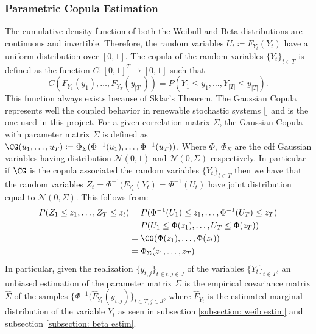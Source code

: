\subsubsection{Parametric Copula Estimation}
The cumulative density function of both the Weibull and Beta distributions are continuous and invertible. Therefore, the random variables \( U_t \coloneqq F_{Y_t}(Y_t) \) have a uniform distribution over \([0,1]\). The copula of the random variables \(\{Y_t\}_{t \in T}\) is defined as the function \(C: [0,1]^T \to [0,1]\) such that 
\begin{equation}
C(F_{Y_1}(y_1), \ldots, F_{Y_T}(y_{|T|})) = P(Y_1 \leq y_1, \ldots, Y_{|T|} \leq y_{|T|}).
\end{equation}
This function always exists because of Sklar's Theorem. The Gaussian Copula represents well the coupled behavior in renewable stochastic systems [\cite{GaussCopula}] and is the one used in this project. For a given correlation matrix \(\Sigma\), the Gaussian Copula with parameter matrix \(\Sigma\) is defined as \(\CG(u_1,\ldots,u_{T}) \coloneqq \Phi_{\Sigma}(\Phi^{-1}(u_1),\ldots, \Phi^{-1}(u_T))\). Where \(\Phi,\; \Phi_{\Sigma}\) are the cdf Gaussian variables having distribution \(\mathcal{N}(0,1)\) and \( \mathcal{N}(0,\Sigma)\) respectively. In particular if \(\CG\) is the copula associated the random variables \(\{Y_t\}_{t \in T}\) then we have that the random variables \(Z_t = \Phi^{-1}(F_{Y_t}(Y_t) = \Phi^{-1}(U_t)\) have joint distribution equal to \(\mathcal{N}(0, \Sigma)\). This follows from: \\
\begin{align*}
P(Z_1 \leq z_1, \ldots, Z_T \leq z_t) &= P(\Phi^{-1}(U_1) \leq z_1, \ldots, \Phi^{-1}(U_T) \leq z_T) \\
&= P(U_1 \leq \Phi(z_1), \ldots, U_T \leq \Phi(z_T)) \\
&= \CG(\Phi(z_1), \ldots, \Phi(z_t)) \\
&= \Phi_{\Sigma}(z_1, \ldots, z_T)
\end{align*}
In particular, given the realization \(\{y_{t,j}\}_{t \in t, j \in J}\) of the variables \(\{Y_t\}_{t \in T}\), an unbiased estimation of the parameter matrix \(\Sigma\) is the empirical covariance matrix \(\hat \Sigma\) of the samples \(\{\Phi^{-1}(\hat{F}_{Y_t}(y_{t,j})\}_{t\in T, j \in J}\), where \(\hat{F}_{Y_t}\) is the estimated marginal distribution of the variable \(Y_t\) as seen in subsection \ref{subsection: weib estim} and subsection \ref{subsection: beta estim}.\\


